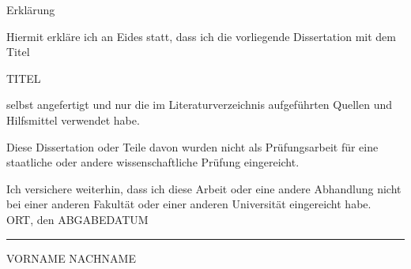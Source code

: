 \documentclass[de,phd]{swathesis}
\begin{document}
\pagestyle{plain}

{\noindent\LARGE Erklärung\par}\vspace{2\baselineskip}
\noindent
  Hiermit erkläre ich an Eides statt, dass ich die vorliegende Dissertation
  mit dem Titel
  \begin{center}%
       TITEL
  \end{center}
  selbst angefertigt und nur die im Literaturverzeichnis aufgeführten Quellen
  und Hilfsmittel verwendet habe.

  Diese Dissertation oder Teile davon wurden nicht als Prüfungsarbeit für
  eine staatliche oder andere wissenschaftliche Prüfung eingereicht.

  Ich versichere weiterhin, dass ich diese Arbeit oder eine andere Abhandlung
  nicht bei einer anderen Fakultät oder einer anderen Universität eingereicht
  habe.
  ~\\[7\baselineskip]%
  ORT, den ABGABEDATUM \hfill \rule{.45\textwidth}{0.4pt}\par
    \raggedleft%
    VORNAME NACHNAME
\end{document}

